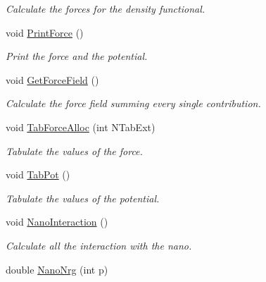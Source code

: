 \begin{DoxyCompactItemize}
\begin{DoxyCompactList}\small\item\em \-Calculate the forces for the density functional. \end{DoxyCompactList}\item 
\hypertarget{classForces_a7b92a25206538d578d6129879bfac183}{void \hyperlink{classForces_a7b92a25206538d578d6129879bfac183}{\-Print\-Force} ()}\label{classForces_a7b92a25206538d578d6129879bfac183}

\begin{DoxyCompactList}\small\item\em \-Print the force and the potential. \end{DoxyCompactList}\item 
\hypertarget{classForces_a68e26f1fe45d8de3362c59de39ddcbc9}{void \hyperlink{classForces_a68e26f1fe45d8de3362c59de39ddcbc9}{\-Get\-Force\-Field} ()}\label{classForces_a68e26f1fe45d8de3362c59de39ddcbc9}

\begin{DoxyCompactList}\small\item\em \-Calculate the force field summing every single contribution. \end{DoxyCompactList}\item 
\hypertarget{classForces_ab7b56f14cb877cece5075bc6a160aab3}{void \hyperlink{classForces_ab7b56f14cb877cece5075bc6a160aab3}{\-Tab\-Force\-Alloc} (int \-N\-Tab\-Ext)}\label{classForces_ab7b56f14cb877cece5075bc6a160aab3}

\begin{DoxyCompactList}\small\item\em \-Tabulate the values of the force. \end{DoxyCompactList}\item 
\hypertarget{classForces_a1c00d241ca805ba05becca0e9aafe45f}{void \hyperlink{classForces_a1c00d241ca805ba05becca0e9aafe45f}{\-Tab\-Pot} ()}\label{classForces_a1c00d241ca805ba05becca0e9aafe45f}

\begin{DoxyCompactList}\small\item\em \-Tabulate the values of the potential. \end{DoxyCompactList}\item 
\hypertarget{classForces_ac56bd243d0c3cac921959104fac03d2c}{void \hyperlink{classForces_ac56bd243d0c3cac921959104fac03d2c}{\-Nano\-Interaction} ()}\label{classForces_ac56bd243d0c3cac921959104fac03d2c}

\begin{DoxyCompactList}\small\item\em \-Calculate all the interaction with the nano. \end{DoxyCompactList}\item 
\hypertarget{classForces_a7ab5c0bcf11c3f33530a25984720b424}{double \hyperlink{classForces_a7ab5c0bcf11c3f33530a25984720b424}{\-Nano\-Nrg} (int p)}\label{classForces_a7ab5c0bcf11c3f33530a25984720b424}


\end{DoxyCompactItemize}
